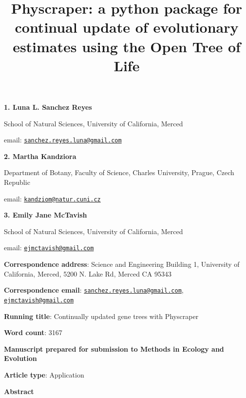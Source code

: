 \documentclass[]{article}
\title{Physcraper: a python package for continual update of evolutionary estimates using the Open Tree of Life}
\author{}
\date{\vspace{-2.5em}}
\begin{document}
\maketitle

\textbf{1. Luna L. Sanchez Reyes}

School of Natural Sciences, University of California, Merced

email: \href{mailto:sanchez.reyes.luna@gmail.com}{\nolinkurl{sanchez.reyes.luna@gmail.com}}

\textbf{2. Martha Kandziora}

Department of Botany, Faculty of Science, Charles University, Prague, Czech Republic

email: \href{mailto:kandziom@natur.cuni.cz}{\nolinkurl{kandziom@natur.cuni.cz}}

\textbf{3. Emily Jane McTavish}

School of Natural Sciences, University of California, Merced

email: \href{mailto:ejmctavish@gmail.com}{\nolinkurl{ejmctavish@gmail.com}}

\textbf{Correspondence address}: Science and Engineering Building 1, University of California, Merced, 5200 N. Lake Rd, Merced CA 95343

\textbf{Correspondence email}: \href{mailto:sanchez.reyes.luna@gmail.com}{\nolinkurl{sanchez.reyes.luna@gmail.com}}, \href{mailto:ejmctavish@gmail.com}{\nolinkurl{ejmctavish@gmail.com}}

\textbf{Running title}: Continually updated gene trees with Physcraper

\textbf{Word count}: 3167

\textbf{Manuscript prepared for submission to Methods in Ecology and Evolution}

\textbf{Article type}: Application

\newpage

\begingroup\Large

\textbf{Abstract}
\endgroup
\end{document}
